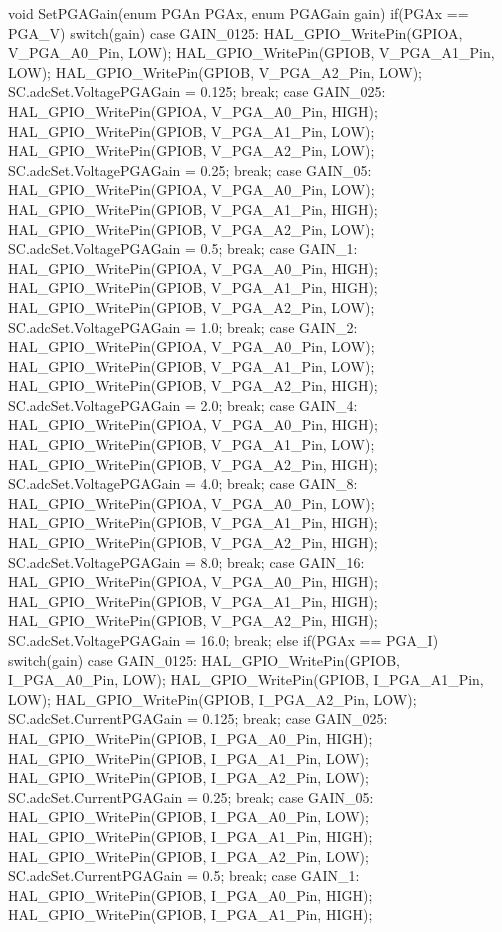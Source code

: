 void SetPGAGain(enum PGAn PGAx, enum PGAGain gain){
	if(PGAx == PGA_V){
		switch(gain){
		case GAIN_0125:
			  HAL_GPIO_WritePin(GPIOA, V_PGA_A0_Pin, LOW);
			  HAL_GPIO_WritePin(GPIOB, V_PGA_A1_Pin, LOW);
			  HAL_GPIO_WritePin(GPIOB, V_PGA_A2_Pin, LOW);
			  SC.adcSet.VoltagePGAGain = 0.125;
		break;
		case GAIN_025:
			  HAL_GPIO_WritePin(GPIOA, V_PGA_A0_Pin, HIGH);
			  HAL_GPIO_WritePin(GPIOB, V_PGA_A1_Pin, LOW);
			  HAL_GPIO_WritePin(GPIOB, V_PGA_A2_Pin, LOW);
			  SC.adcSet.VoltagePGAGain = 0.25;
		break;
		case GAIN_05:
			  HAL_GPIO_WritePin(GPIOA, V_PGA_A0_Pin, LOW);
			  HAL_GPIO_WritePin(GPIOB, V_PGA_A1_Pin, HIGH);
			  HAL_GPIO_WritePin(GPIOB, V_PGA_A2_Pin, LOW);
			  SC.adcSet.VoltagePGAGain = 0.5;
		break;
		case GAIN_1:
			  HAL_GPIO_WritePin(GPIOA, V_PGA_A0_Pin, HIGH);
			  HAL_GPIO_WritePin(GPIOB, V_PGA_A1_Pin, HIGH);
			  HAL_GPIO_WritePin(GPIOB, V_PGA_A2_Pin, LOW);
			  SC.adcSet.VoltagePGAGain = 1.0;
		break;
		case GAIN_2:
			  HAL_GPIO_WritePin(GPIOA, V_PGA_A0_Pin, LOW);
			  HAL_GPIO_WritePin(GPIOB, V_PGA_A1_Pin, LOW);
			  HAL_GPIO_WritePin(GPIOB, V_PGA_A2_Pin, HIGH);
			  SC.adcSet.VoltagePGAGain = 2.0;
		break;
		case GAIN_4:
			  HAL_GPIO_WritePin(GPIOA, V_PGA_A0_Pin, HIGH);
			  HAL_GPIO_WritePin(GPIOB, V_PGA_A1_Pin, LOW);
			  HAL_GPIO_WritePin(GPIOB, V_PGA_A2_Pin, HIGH);
			  SC.adcSet.VoltagePGAGain = 4.0;
		break;
		case GAIN_8:
			  HAL_GPIO_WritePin(GPIOA, V_PGA_A0_Pin, LOW);
			  HAL_GPIO_WritePin(GPIOB, V_PGA_A1_Pin, HIGH);
			  HAL_GPIO_WritePin(GPIOB, V_PGA_A2_Pin, HIGH);
			  SC.adcSet.VoltagePGAGain = 8.0;
		break;
		case GAIN_16:
			  HAL_GPIO_WritePin(GPIOA, V_PGA_A0_Pin, HIGH);
			  HAL_GPIO_WritePin(GPIOB, V_PGA_A1_Pin, HIGH);
			  HAL_GPIO_WritePin(GPIOB, V_PGA_A2_Pin, HIGH);
			  SC.adcSet.VoltagePGAGain = 16.0;
		break;
		}
	}else if(PGAx == PGA_I){
		switch(gain){
		case GAIN_0125:
			  HAL_GPIO_WritePin(GPIOB, I_PGA_A0_Pin, LOW);
			  HAL_GPIO_WritePin(GPIOB, I_PGA_A1_Pin, LOW);
			  HAL_GPIO_WritePin(GPIOB, I_PGA_A2_Pin, LOW);
			  SC.adcSet.CurrentPGAGain = 0.125;
		break;
		case GAIN_025:
			  HAL_GPIO_WritePin(GPIOB, I_PGA_A0_Pin, HIGH);
			  HAL_GPIO_WritePin(GPIOB, I_PGA_A1_Pin, LOW);
			  HAL_GPIO_WritePin(GPIOB, I_PGA_A2_Pin, LOW);
			  SC.adcSet.CurrentPGAGain = 0.25;
		break;
		case GAIN_05:
			  HAL_GPIO_WritePin(GPIOB, I_PGA_A0_Pin, LOW);
			  HAL_GPIO_WritePin(GPIOB, I_PGA_A1_Pin, HIGH);
			  HAL_GPIO_WritePin(GPIOB, I_PGA_A2_Pin, LOW);
			  SC.adcSet.CurrentPGAGain = 0.5;
		break;
		case GAIN_1:
			  HAL_GPIO_WritePin(GPIOB, I_PGA_A0_Pin, HIGH);
			  HAL_GPIO_WritePin(GPIOB, I_PGA_A1_Pin, HIGH);
}}}
